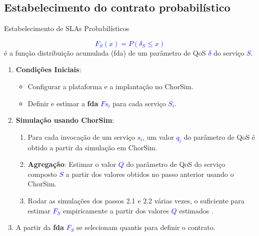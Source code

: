 \documentclass[xcolor=svgnames]{beamer}
\begin{document}
  \subsection{Estabelecimento do contrato probabilístico}

  \begin{frame}{Estabelecimento de SLAs Probabilísticos}

        \textcolor{Blue}{$$F_S(x) = P(\delta_S \leq x)$$ } é a função distribuição acumulada (fda) de um parâmetro
       de QoS \textcolor{Blue}{$\delta$} do serviço \textcolor{Blue}{$S$}.
      \pause

      \begin{enumerate}
      \item <1->\textbf{Condições Iniciais}:
	  \begin{itemize}
	    \item <1-> Configurar a plataforma e a implantação no ChorSim.
	    \item <2-> Definir e estimar a \textbf{fda} \textcolor{Blue}{$Fs_i$} para cada  serviço \textcolor{Blue}{$S_i$}.
	  \end{itemize}

      \item <3-> \textbf{Simulação usando \textbf{ChorSim}}:
	  \begin{enumerate}
	  \item <3-> \label{a} Para cada invocação de um serviço \textcolor{Blue}{$s_i$},  um valor \textcolor{Blue}{$q_i$} do parâmetro de QoS 
	    é obtido a partir da simulação em ChorSim.%
	  \item <4-> \label{b} \textbf{Agregação}: Estimar o valor \textcolor{Blue}{$Q$} do parâmetro de QoS do serviço composto \textcolor{Blue}{$S$} 
	  a partir dos valores obtidos 	  no passo anterior usando o ChorSim. %

	  \item <5-> Rodar as simulações dos passos 2.1 e 2.2 várias vezes, o suficiente para estimar \textcolor{Blue}{$F_S$}
	  empiricamente a partir dos valores \textcolor{Blue}{$Q$} estimados .%
	  \end{enumerate}

	\item <6-> A partir da \textbf{fda}  \textcolor{Blue}{$F_S$}  se selecionam quantis para definir o contrato.

    \end{enumerate}
  \end{frame}
\end{document}
